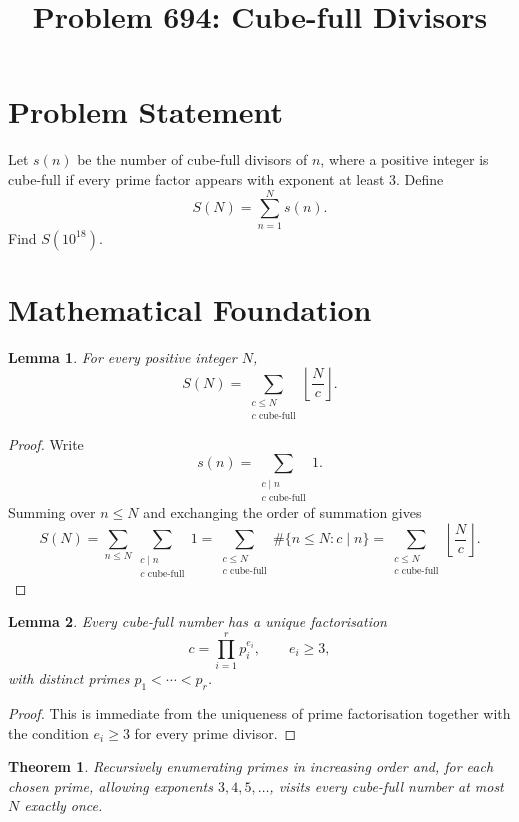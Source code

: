\documentclass[11pt]{article}
\title{Problem 694: Cube-full Divisors}
\author{}
\date{}
\newtheorem{lemma}{Lemma}
\newtheorem{theorem}{Theorem}
\begin{document}
\maketitle

\section{Problem Statement}

Let $s(n)$ be the number of cube-full divisors of $n$, where a positive integer is cube-full if every prime factor appears with exponent at least $3$. Define
\[
  S(N) = \sum_{n=1}^{N} s(n).
\]
Find $S(10^{18})$.

\section{Mathematical Foundation}

\begin{lemma}
For every positive integer $N$,
\[
  S(N) = \sum_{\substack{c \le N \\ c \text{ cube-full}}} \left\lfloor \frac{N}{c} \right\rfloor.
\]
\end{lemma}

\begin{proof}
Write
\[
  s(n) = \sum_{\substack{c \mid n \\ c \text{ cube-full}}} 1.
\]
Summing over $n \le N$ and exchanging the order of summation gives
\[
  S(N)
  =
  \sum_{n \le N}\sum_{\substack{c \mid n \\ c \text{ cube-full}}} 1
  =
  \sum_{\substack{c \le N \\ c \text{ cube-full}}}\#\{n \le N : c \mid n\}
  =
  \sum_{\substack{c \le N \\ c \text{ cube-full}}} \left\lfloor \frac{N}{c} \right\rfloor.
\]
\end{proof}

\begin{lemma}
Every cube-full number has a unique factorisation
\[
  c = \prod_{i=1}^{r} p_i^{e_i},
  \qquad e_i \ge 3,
\]
with distinct primes $p_1 < \cdots < p_r$.
\end{lemma}

\begin{proof}
This is immediate from the uniqueness of prime factorisation together with the condition $e_i \ge 3$ for every prime divisor.
\end{proof}

\begin{theorem}
Recursively enumerating primes in increasing order and, for each chosen prime, allowing exponents $3,4,5,\dots$, visits every cube-full number at most $N$ exactly once.
\end{theorem}
\end{document}
